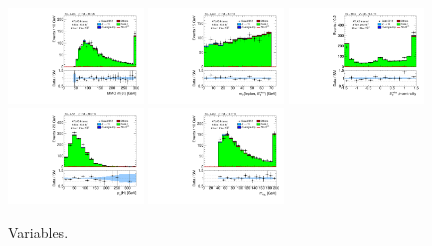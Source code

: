 \begin{figure}[tp]
  \includegraphics[width=0.32\textwidth]{figures/analysis/vbf-SSXCR/mMMC}
  \includegraphics[width=0.32\textwidth]{figures/analysis/vbf-SSXCR/mT}
  \includegraphics[width=0.32\textwidth]{figures/analysis/vbf-SSXCR/met-phi-centrality}
  \includegraphics[width=0.32\textwidth]{figures/analysis/vbf-SSXCR/H-pt-hi}
  \includegraphics[width=0.32\textwidth]{figures/analysis/vbf-SSXCR/mvis}
  \caption{Variables.}
  \label{fig:backgrounds-SSXCR-taus}
\end{figure}

